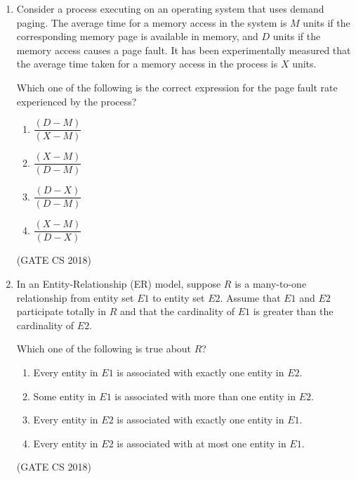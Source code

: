 \documentclass[12pt]{article}
\begin{document}
\begin{enumerate}
\begin{multicols}{4}
\begin{enumerate}
\item QPTRS
\item PTRSQ
\item TRPQS
\item QTPRS
\end{enumerate}
\end{multicols}
(GATE CS 2018)

\item Consider a process executing on an operating system that uses demand paging.  
The average time for a memory access in the system is $M$ units if the corresponding memory page is available in memory, and $D$ units if the memory access causes a page fault.  
It has been experimentally measured that the average time taken for a memory access in the process is $X$ units.  

Which one of the following is the correct expression for the page fault rate experienced by the process?

\begin{multicols}{2}
\begin{enumerate}
\item $\dfrac{(D - M)}{(X - M)}$
\item $\dfrac{(X - M)}{(D - M)}$
\item $\dfrac{(D - X)}{(D - M)}$
\item $\dfrac{(X - M)}{(D - X)}$
\end{enumerate}
\end{multicols}
(GATE CS 2018)

\item In an Entity-Relationship (ER) model, suppose $R$ is a many-to-one relationship from entity set $E1$ to entity set $E2$. Assume that $E1$ and $E2$ participate totally in $R$ and that the cardinality of $E1$ is greater than the cardinality of $E2$.  

Which one of the following is true about $R$?

\begin{enumerate}
\item Every entity in $E1$ is associated with exactly one entity in $E2$.
\item Some entity in $E1$ is associated with more than one entity in $E2$.
\item Every entity in $E2$ is associated with exactly one entity in $E1$.
\item Every entity in $E2$ is associated with at most one entity in $E1$.
\end{enumerate}
(GATE CS 2018)


\end{enumerate}
\end{document}
